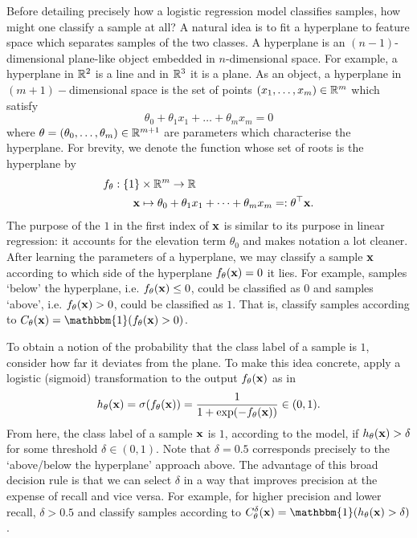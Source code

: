 \documentclass[11pt]{article}
\begin{document}
Before detailing precisely how a logistic regression model classifies samples, how might one classify a sample at all? A natural idea is to fit a hyperplane to feature space which separates samples of the two classes. A hyperplane is an $(n-1)$-dimensional plane-like object embedded in $n$-dimensional space. For example, a hyperplane in $\mathbb{R}^2$ is a line and in $\mathbb{R}^3$ it is a plane. As an object, a hyperplane in $(m+1)-$dimensional space is the set of points $(x_1,\dots,x_m)\in\mathbb{R}^m$ which satisfy %
$$
\theta_0+\theta_1x_1+\dots+\theta_mx_m
=
0
$$
where $\theta=(\theta_0,\dots,\theta_m)\in\mathbb{R}^{m+1}$ are parameters which characterise the hyperplane. For brevity, we denote the function whose set of roots is the hyperplane by
\begin{align*}
    f_{\theta}:\{1\}&\times\mathbb{R}^m\to\mathbb{R}\\
    \mathbf{x}&\mapsto \theta_0+\theta_1x_1+\dots+\theta_mx_m=:\theta^\top \mathbf{x}.
\end{align*}
The purpose of the $1$ in the first index of $\mathbf{x}$ is similar to its purpose in linear regression: it accounts for the elevation term $\theta_0$ and makes notation a lot cleaner. After learning the parameters of a hyperplane, we may classify a sample $\mathbf{x}$ according to which side of the hyperplane $f_{\theta}(\mathbf{x})=0$ it lies. For example, samples `below' the hyperplane, i.e. $f_{\theta}(\mathbf{x})\leq0$, could be classified as $0$ and samples `above', i.e. $f_{\theta}(\mathbf{x})>0$, could be classified as $1$. That is, classify samples according to $C_{\theta}(\x)=\mathbbm{1}(f_{\theta}(\x)>0)$.

To obtain a notion of the probability that the class label of a sample is $1$, consider how far it deviates from the plane. To make this idea concrete, apply a logistic (sigmoid) transformation to the output $f_{\theta}(\mathbf{x})$ as in
$$
h_{\theta}(\mathbf{x})
=
\sigma(f_{\theta}(\mathbf{x}))
=
\frac{1}{1+\exp(-f_{\theta}(\mathbf{x}))}\in(0,1).
$$
From here, the class label of a sample $\mathbf{x}$ is $1$, according to the model, if $h_{\theta}(\mathbf{x})>\delta$ for some threshold $\delta\in(0,1)$. Note that $\delta=0.5$ corresponds precisely to the `above/below the hyperplane' approach above. The advantage of this broad decision rule is that we can select $\delta$ in a way that improves precision at the expense of recall and vice versa. For example, for higher precision and lower recall, $\delta>0.5$ and classify samples according to $C_{\theta}^{\delta}(\x)=\mathbbm{1}(h_{\theta}(\x)>\delta)$.
\end{document}
